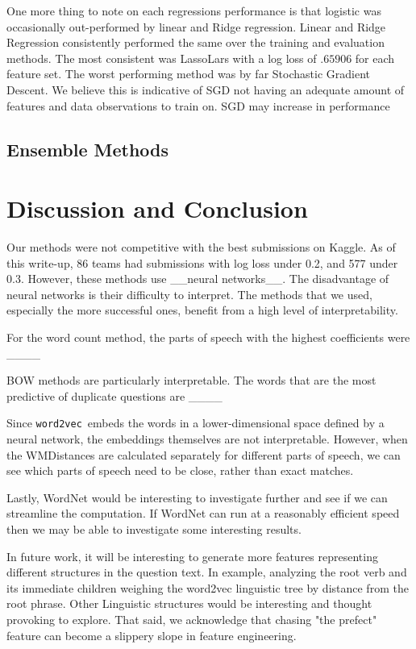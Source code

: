 \documentclass{article} %
\newcommand{\wordtvec}{\texttt{word2vec}}
\begin{document}
One more thing to note on each regressions performance is that logistic was occasionally out-performed by linear and Ridge regression. Linear and Ridge Regression consistently performed the same over the training and evaluation methods. The most consistent was LassoLars with a log loss of $.65906$ for each feature set. The worst performing method was by far Stochastic Gradient Descent. We believe this is indicative of SGD not having an adequate amount of features and data observations to train on. SGD may increase in performance 
\subsection{Ensemble Methods}

\section{Discussion and Conclusion}

Our methods were not competitive with the best submissions on Kaggle. As of this write-up, 86 teams had submissions with log loss under 0.2, and 577 under 0.3. However, these methods use \_\_neural networks\_\_. The disadvantage of neural networks is their difficulty to interpret. The methods that we used, especially the more successful ones, benefit from a high level of interpretability. 

For the word count method, the parts of speech with the highest coefficients were \_\_\_\_

BOW methods are particularly interpretable. The words that are the most predictive of duplicate questions are \_\_\_\_

Since \wordtvec\ embeds the words in a lower-dimensional space defined by a neural network, the embeddings themselves are not interpretable. However, when the WMDistances are calculated separately for different parts of speech, we can see which parts of speech need to be close, rather than exact matches. 

Lastly, WordNet would be interesting to investigate further and see if we can streamline the computation. If WordNet can run at a reasonably efficient speed then we may be able to investigate some interesting results. 

In future work, it will be interesting to generate more features representing different structures in the question text. In example, analyzing the root verb and its immediate children weighing the word2vec linguistic tree by distance from the root phrase. Other Linguistic structures would be interesting and thought provoking to explore. That said, we acknowledge that chasing "the prefect" feature can become a slippery slope in feature engineering.
\end{document}
